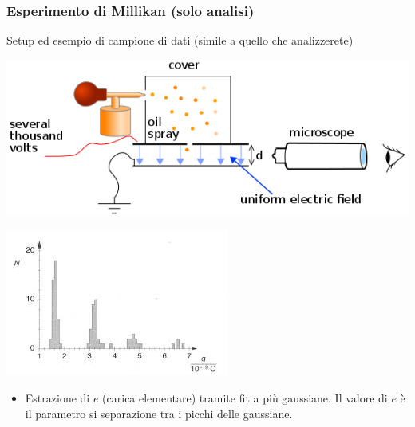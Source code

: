 \frame
{
  \frametitle{Esperimento di Millikan (solo analisi)}

  Setup ed esempio di campione di dati (simile a quello che analizzerete)
  \begin{minipage}{0.5\linewidth}{
     \includegraphics[width=0.9\linewidth]{figs/Mill.png}
  }\end{minipage}\begin{minipage}{0.5\linewidth}{
     \includegraphics[width=0.9\linewidth]{figs/MillIst.png}
  }\end{minipage}
\begin{itemize}
\item Estrazione di $e$ (carica elementare) tramite fit a pi\`u gaussiane. Il valore di $e$ \`e il parametro si separazione
      tra i picchi delle gaussiane.
\end{itemize}


}
